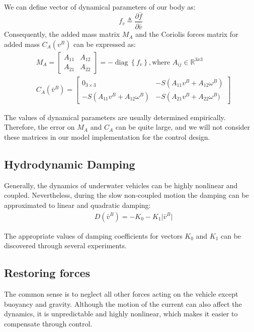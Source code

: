     We can define vector of dynamical parameters of our body as:
    $$
    f_{\dot{v}} \triangleq \frac{\partial \bar{f}}{\partial \dot{\bar{v}}}
    $$
    Consequently, the added mass matrix $M_A$ and 
    the Coriolis forces matrix for added mass $C_A(v^B)$
    can be expressed as: 
    $$
    \begin{aligned}
        & M_A=\left[\begin{array}{cc}
            A_{11} & A_{12} \\
            A_{21} & A_{22}
            \end{array}\right]=-\operatorname{diag}\left\{f_{\dot{v}}\right\}, \textrm{where } A_{ij} \in \mathbb{R}^{3 x 3} \\
        & C_A(\bar{v}^B)=\left[\begin{array}{cc}
        0_{3 \times 3} & -S\left(A_{11} v^B+A_{12} \omega^B\right) \\
        -S\left(A_{11} v^B+A_{12} \omega^B\right) & -S\left(A_{21} v^B+A_{22} \omega^B)\right.
        \end{array}\right]
    \end{aligned}
    $$

    The values of dynamical parameters are usually determined
    empirically. Therefore, the error on $M_A$ and $C_A$ can be quite large, and we will not consider
    these matrices in our model implementation for the control design.

\subsection{Hydrodynamic Damping}

    Generally, the dynamics of underwater vehicles can be highly nonlinear and coupled.
    Nevertheless, during the slow non-coupled motion the damping can be approximated to linear and quadratic damping:
    $$\begin{aligned}
        & D(\bar{v}^B)=-K_{0} - K_{1}\lvert \bar{v}^B \rvert
    \end{aligned}
    $$

    The appropriate values of damping coefficients for vectors $K_{0}$ and $K_{1}$ can be discovered through several experiments.

\subsection{Restoring forces}

    The common sense is to neglect all other forces acting on the vehicle except buoyancy and gravity. 
    Although the motion of the current can also affect the dynamics, it is unpredictable and highly nonlinear, 
    which makes it easier to compensate through control.

